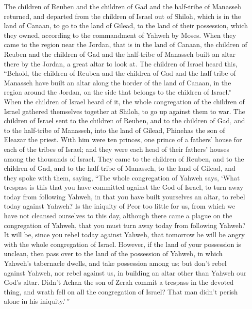  The children of Reuben and the children of Gad and the
half-tribe of Manasseh returned, and departed from the children of
Israel out of Shiloh, which is in the land of Canaan, to go to the land
of Gilead, to the land of their possession, which they owned, according
to the commandment of Yahweh by Moses.  When they came to
the region near the Jordan, that is in the land of Canaan, the children
of Reuben and the children of Gad and the half-tribe of Manasseh built
an altar there by the Jordan, a great altar to look at. 
The children of Israel heard this, ``Behold, the children of Reuben and
the children of Gad and the half-tribe of Manasseh have built an altar
along the border of the land of Canaan, in the region around the Jordan,
on the side that belongs to the children of Israel.'' 
When the children of Israel heard of it, the whole congregation of the
children of Israel gathered themselves together at Shiloh, to go up
against them to war.  The children of Israel sent to the
children of Reuben, and to the children of Gad, and to the half-tribe of
Manasseh, into the land of Gilead, Phinehas the son of Eleazar the
priest.  With him were ten princes, one prince of a
fathers' house for each of the tribes of Israel; and they were each head
of their fathers' houses among the thousands of Israel. 
They came to the children of Reuben, and to the children of Gad, and to
the half-tribe of Manasseh, to the land of Gilead, and they spoke with
them, saying,  ``The whole congregation of Yahweh says,
`What trespass is this that you have committed against the God of
Israel, to turn away today from following Yahweh, in that you have built
yourselves an altar, to rebel today against Yahweh?  Is
the iniquity of Peor too little for us, from which we have not cleansed
ourselves to this day, although there came a plague on the congregation
of Yahweh,  that you must turn away today from following
Yahweh? It will be, since you rebel today against Yahweh, that tomorrow
he will be angry with the whole congregation of Israel. 
However, if the land of your possession is unclean, then pass over to
the land of the possession of Yahweh, in which Yahweh's tabernacle
dwells, and take possession among us; but don't rebel against Yahweh,
nor rebel against us, in building an altar other than Yahweh our God's
altar.  Didn't Achan the son of Zerah commit a trespass
in the devoted thing, and wrath fell on all the congregation of Israel?
That man didn't perish alone in his iniquity.'\,''

